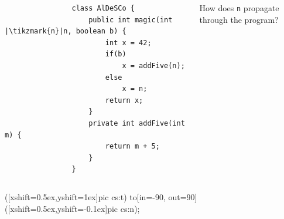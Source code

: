 \documentclass[aspectratio=169, usepdftitle=false, xcolor={dvipsnames}]{beamer}
\begin{document}
\begin{frame}[fragile]
{}
	\begin{columns}[c]
		\begin{column}{0.55\textwidth}
			\begin{dottedborder}
			\begin{verbatim}
				class AlDeSCo {
					public int magic(int |\tikzmark{n}|n, boolean b) {
						int x = 42;
						if(b)
							x = addFive(n);
						else
							x = n;
						return x;
					}
					private int addFive(int m) {
						return m + 5;
					}
				}
			\end{verbatim}
			\end{dottedborder}
		\end{column}
		\begin{column}{0.35\textwidth}
			\block How does \texttt{n} propagate through the program?\endblock\bigskip
			\centerline{}
		\end{column}
	\end{columns}
	 ([xshift=0.5ex,yshift=1ex]pic cs:t) to[in=-90, out=90] ([xshift=0.5ex,yshift=-0.1ex]pic cs:n);
\end{frame}
\end{document}
